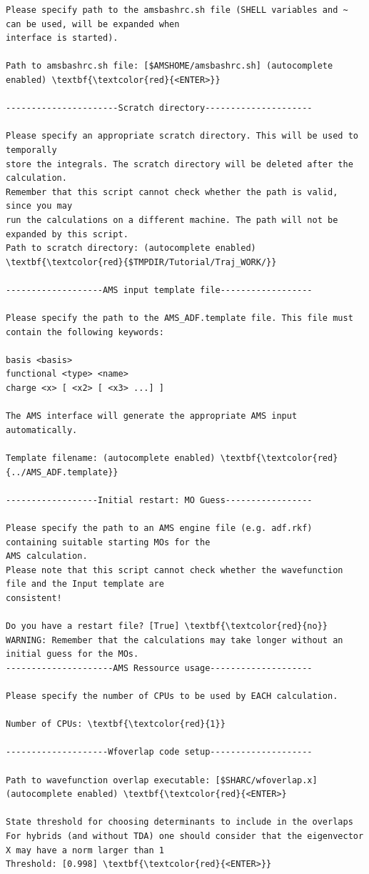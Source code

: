 \documentclass[a4paper,11pt,DIV=15,openany]{scrbook}
\begin{document}
\begin{oframed}
\begin{Verbatim}[commandchars=\\\{\}]
Please specify path to the amsbashrc.sh file (SHELL variables and ~ can be used, will be expanded when 
interface is started).

Path to amsbashrc.sh file: [$AMSHOME/amsbashrc.sh] (autocomplete enabled) \textbf{\textcolor{red}{<ENTER>}}

----------------------Scratch directory---------------------

Please specify an appropriate scratch directory. This will be used to temporally 
store the integrals. The scratch directory will be deleted after the calculation. 
Remember that this script cannot check whether the path is valid, since you may 
run the calculations on a different machine. The path will not be expanded by this script.
Path to scratch directory: (autocomplete enabled) \textbf{\textcolor{red}{$TMPDIR/Tutorial/Traj_WORK/}}

-------------------AMS input template file------------------

Please specify the path to the AMS_ADF.template file. This file must contain the following keywords:

basis <basis>
functional <type> <name>
charge <x> [ <x2> [ <x3> ...] ]

The AMS interface will generate the appropriate AMS input automatically.

Template filename: (autocomplete enabled) \textbf{\textcolor{red}{../AMS_ADF.template}}

------------------Initial restart: MO Guess-----------------

Please specify the path to an AMS engine file (e.g. adf.rkf) containing suitable starting MOs for the 
AMS calculation. 
Please note that this script cannot check whether the wavefunction file and the Input template are 
consistent!

Do you have a restart file? [True] \textbf{\textcolor{red}{no}}
WARNING: Remember that the calculations may take longer without an initial guess for the MOs.
---------------------AMS Ressource usage--------------------

Please specify the number of CPUs to be used by EACH calculation.

Number of CPUs: \textbf{\textcolor{red}{1}} 

--------------------Wfoverlap code setup--------------------

Path to wavefunction overlap executable: [$SHARC/wfoverlap.x] (autocomplete enabled) \textbf{\textcolor{red}{<ENTER>}

State threshold for choosing determinants to include in the overlaps
For hybrids (and without TDA) one should consider that the eigenvector X may have a norm larger than 1
Threshold: [0.998] \textbf{\textcolor{red}{<ENTER>}}


\end{Verbatim}
\end{oframed}
\end{document}
